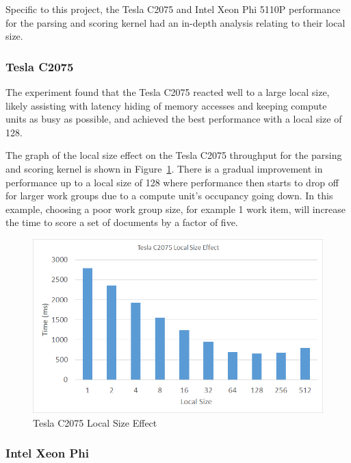 Specific to this project, the Tesla C2075 and Intel Xeon Phi 5110P performance
for the parsing and scoring kernel had an in-depth analysis relating to their
local size.

\subsubsection{Tesla C2075}

The experiment found that the Tesla C2075 reacted well to a large local size,
likely assisting with latency hiding of memory accesses and keeping compute
units as busy as possible, and achieved the best performance with a local size
of 128.

The graph of the local size effect on the Tesla C2075 throughput for the parsing
and scoring kernel is shown in Figure~\ref{fig:teslaLocalSize}. There is a
gradual improvement in performance up to a local size of 128 where performance
then starts to drop off for larger work groups due to a compute unit's occupancy
going down. In this example, choosing a poor work group size, for example 1 work
item, will increase the time to score a set of documents by a factor of five.

\begin{figure}[H]
\includegraphics[width=\linewidth]{images/teslaLocalSize.png}
\caption{Tesla C2075 Local Size Effect}
\label{fig:teslaLocalSize}
\end{figure}

\subsubsection{Intel Xeon Phi}

